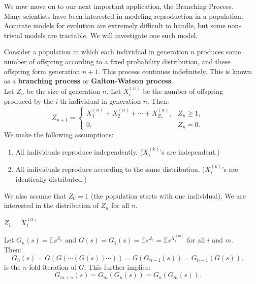 \documentclass{huhtakm-template-book-v2}
\newcommand{\expect}{\mathbb{E}}
\begin{document}
    We now move on to our next important application, the Branching Process.\\
    Many scientists have been interested in modeling reproduction in a population. Accurate models for evolution are extremely difficult to handle, but some non-trivial models are tractable. We will investigate one such model.
    \begin{eg}
        Consider a population in which each individual in generation $n$ produces some number of offspring according to a fixed probability distribution, and these offspring form generation $n+1$. This process continues indefinitely. This is known as a \textbf{branching process} or \textbf{Galton-Watson process}.\\
        Let $Z_{n}$ be the size of generation $n$. Let $X_{i}^{(n)}$ be the number of offspring produced by the $i$-th individual in generation $n$. Then:
        \begin{equation*}
            Z_{n+1} = \begin{cases}
                X_{1}^{(n)}+X_{2}^{(n)}+\cdots+X_{Z_{n}}^{(n)}, &Z_{n} \geq 1,\\
                0, &Z_{n} = 0.
            \end{cases}
        \end{equation*}
        We make the following assumptions:
        \begin{enumerate}
            \item All individuals reproduce independently. ($X_{i}^{(k)}$'s are independent.)
            \item All individuals reproduce according to the same distribution. ($X_{i}^{(k)}$'s are identically distributed.)
        \end{enumerate}
        We also assume that $Z_{0} = 1$ (the population starts with one individual). We are interested in the distribution of $Z_{n}$ for all $n$.
    \end{eg}
    \begin{rem}
        $Z_{1} = X_{1}^{(0)}$
    \end{rem}
    \begin{thm}
        \label{Chapter 7 (Theorem) Galton-Watson process PGF n-fold iterate properties}
        Let $G_{n}(s) = \expect{s^{Z_{n}}}$ and $G(s) = G_{1}(s) = \expect{s^{Z_{1}}} = \expect{s^{X_{i}^{(m)}}}$ for all $i$ and $m$. Then:
        \begin{equation*}
            G_{n}(s) = G(G(\cdots(G(s))\cdots)) = G(G_{n-1}(s)) = G_{n-1}(G(s)),
        \end{equation*}
        is the $n$-fold iteration of $G$. This further implies:
        \begin{equation*}
            G_{m+n}(s) = G_{m}(G_{n}(s)) = G_{n}(G_{m}(s)).
        \end{equation*}
    \end{thm}
\end{document}
